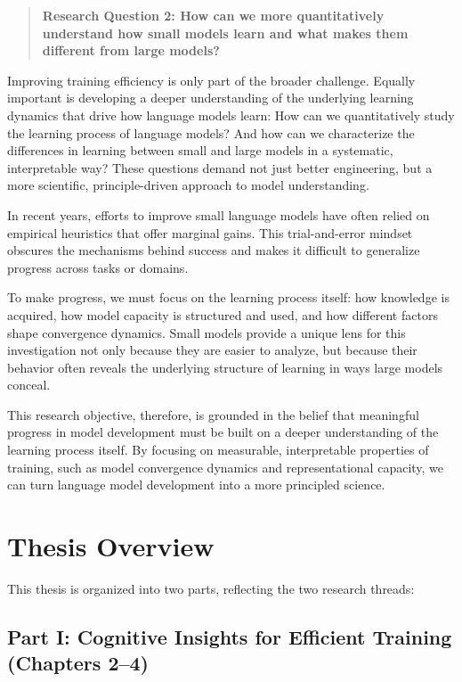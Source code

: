 \begin{quote}
    \textbf{Research Question 2: How can we more quantitatively understand how small models learn and what makes them different from large models?}
\end{quote}

Improving training efficiency is only part of the broader challenge. Equally important is developing a deeper understanding of the underlying learning dynamics that drive how language models learn: How can we quantitatively study the learning process of language models? And how can we characterize the differences in learning between small and large models in a systematic, interpretable way? These questions demand not just better engineering, but a more scientific, principle-driven approach to model understanding.

In recent years, efforts to improve small language models have often relied on empirical heuristics that offer marginal gains. This trial-and-error mindset obscures the mechanisms behind success and makes it difficult to generalize progress across tasks or domains. 

To make progress, we must focus on the learning process itself: how knowledge is acquired, how model capacity is structured and used, and how different factors shape convergence dynamics. Small models provide a unique lens for this investigation not only because they are easier to analyze, but because their behavior often reveals the underlying structure of learning in ways large models conceal.

This research objective, therefore, is grounded in the belief that meaningful progress in model development must be built on a deeper understanding of the learning process itself. By focusing on measurable, interpretable properties of training, such as model convergence dynamics and representational capacity, we can turn language model development into a more principled science.

\section*{Thesis Overview}

This thesis is organized into two parts, reflecting the two research threads:

\subsection*{Part I: Cognitive Insights for Efficient Training (Chapters 2–4)}

